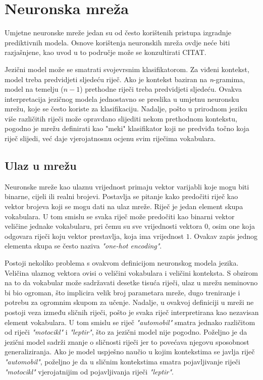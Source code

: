 \documentclass[times, utf8, diplomski, numeric]{fer}
\begin{document}
\chapter{Neuronska mreža}

Umjetne neuronske mreže jedan su od često korištenih pristupa izgradnje prediktivnih modela. Osnove korištenja neuronskih mreža ovdje neće biti razjašnjene, kao uvod u to područje može se konzultirati CITAT.

Jezični model može se smatrati svojevrsnim klasifikatorom. Za viđeni kontekst, model treba predvidjeti sljedeću riječ. Ako je kontekst baziran na \textit{n}-gramima, model na temelju ($n - 1$) prethodne riječi treba predvidjeti sljedeću. Ovakva interpretacija jezičnog modela jednostavno se preslika u umjetnu neuronsku mrežu, koje se često koriste za klasifikaciju. Nadalje, pošto u prirodnom jeziku više različitih riječi može opravdano slijediti nekom prethodnom kontekstu, pogodno je mrežu definirati kao "meki" klasifikator koji ne predviđa točno koja riječ slijedi, već daje vjerojatnosnu ocjenu svim riječima vokabulara.

\section{Ulaz u mrežu}
\label{sec:lnnet_input}
Neuronske mreže kao ulaznu vrijednost primaju vektor varijabli koje mogu biti binarne, cijeli ili realni brojevi. Postavlja se pitanje kako predočiti riječ kao vektor brojeva koji se mogu dati na ulaz mreže. Riječ je jedan element skupa vokabulara. U tom smislu se svaka riječ može predočiti kao binarni vektor veličine jednake vokabularu, pri čemu su sve vrijednosti vektora $0$, osim one koja odgovara riječi koju vektor prestavlja, koja ima vrijednost $1$. Ovakav zapis jednog elementa skupa se često naziva \textit{"one-hot encoding"}.

Postoji nekoliko problema s ovakvom definicijom neuronskog modela jezika. Veličina ulaznog vektora ovisi o veličini vokabulara i veličini konteksta. S obzirom na to da vokabular može sadržavati desetke tisuća riječi, ulaz u mrežu neminovno bi bio ogroman, što implicira velik broj parametara mreže, dugo treniranje i potrebu za ogromnim skupom za učenje. Nadalje, u ovakvoj definiciji u mreži ne postoji veza između sličnih riječi, pošto je svaka riječ interpretirana kao nezavisan element vokabulara. U tom smislu se riječ \textit{"automobil"} smatra jednako različitom od riječi \textit{"motocikl"} i \textit{"leptir"}, što za jezični model nije pogodno. Poželjno je da jezični model sadrži znanje o sličnosti riječi jer to povećava njegovu sposobnost generaliziranja. Ako je model uspješno naučio u kojim kontekstima se javlja riječ \textit{"automobil"}, poželjno je da u sličnim kontekstima smatra pojavljivanje riječi \textit{"motocikl"} vjerojatnijim od pojavljivanja riječi \textit{"leptir"}.
\end{document}
